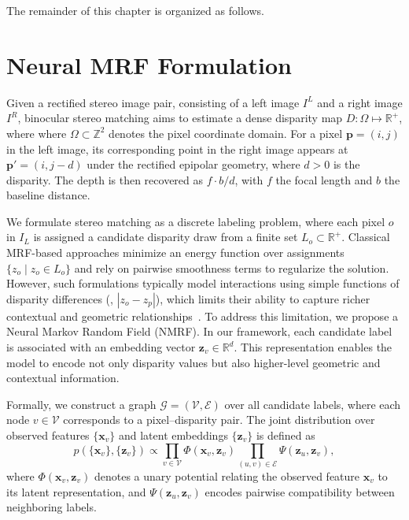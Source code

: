 The remainder of this chapter is organized as follows.

\section{Neural MRF Formulation}\label{sec:mrf-model}
Given a rectified stereo image pair, consisting of a left image $I^L$ and a right image $I^R$, binocular stereo matching aims to estimate a dense disparity map $D: \Omega \mapsto \mathbb{R}^+$, where where $\Omega \subset \mathbb{Z}^2$ denotes the pixel coordinate domain.
For a pixel $\mathbf{p} = (i,j)$ in the left image, its corresponding point in the right image appears at $\mathbf{p}' = (i, j-d)$ under the rectified epipolar geometry, where $d > 0$ is the disparity.
The depth is then recovered as $f \cdot b / d$, with $f$ the focal length and $b$ the baseline distance.

We formulate stereo matching as a discrete labeling problem, where each pixel $o$ in $I_L$ is assigned a candidate disparity draw from a finite set $L_o \subset \mathbb{R}^+$.
Classical MRF-based approaches minimize an energy function over assignments $\{z_o \mid z_o \in L_o\}$ and rely on pairwise smoothness terms to regularize the solution.
However, such formulations typically model interactions using simple functions of disparity differences (\eg, $|z_o - z_p|$), which limits their ability to capture richer contextual and geometric relationships~\cite{szeliski2008comparative}.
To address this limitation, we propose a Neural Markov Random Field (NMRF).
In our framework, each candidate label is associated with an embedding vector $\mathbf{z}_v \in \mathbb{R}^d$. 
This representation enables the model to encode not only disparity values but also higher-level geometric and contextual information.

Formally, we construct a graph $\mathcal{G} = (\mathcal{V}, \mathcal{E})$ over all candidate labels, where each node $v \in \mathcal{V}$ corresponds to a pixel–disparity pair.
The joint distribution over observed features $\{\mathbf{x}_v\}$ and latent embeddings $\{\mathbf{z}_v\}$ is defined as
\begin{equation}
	p(\{\mathbf{x}_v\}, \{\mathbf{z}_v\}) \propto \prod_{v \in \mathcal{V}} \Phi(\mathbf{x}_v, \mathbf{z}_v)\prod_{(u,v)\in \mathcal{E}} \Psi(\mathbf{z}_u, \mathbf{z}_v),
\end{equation}
where $\Phi(\mathbf{x}_v, \mathbf{z}_v)$ denotes a unary potential relating the observed feature $\mathbf{x}_v$ to its latent representation, and $\Psi(\mathbf{z}_u, \mathbf{z}_v)$ encodes pairwise compatibility between neighboring labels.

